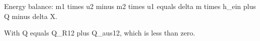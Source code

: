 Energy balance: m1 times u2 minus m2 times u1 equals delta m times h_ein plus Q minus delta X.

With Q equals Q_R12 plus Q_aus12, which is less than zero.